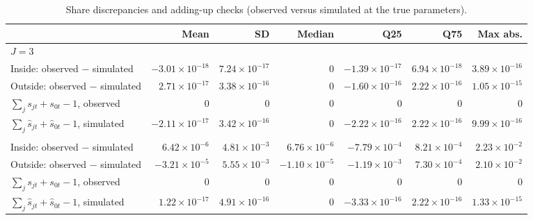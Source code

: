 \begin{table}[H]
\centering\small
\caption{Share discrepancies and adding-up checks (observed versus simulated at the true parameters).}\label{tab:q6c_shares}
\begin{adjustbox}{max width=\linewidth}
\begin{tabular}{lrrrrrr}
\toprule
 & Mean & SD & Median & Q25 & Q75 & Max abs. \\
\midrule
\multicolumn{7}{l}{\emph{$J=3$}} \\
\quad Inside: observed $-$ simulated & $-3.01\times 10^{-18}$ & $7.24\times 10^{-17}$ & 0 & $-1.39\times 10^{-17}$ & $6.94\times 10^{-18}$ & $3.89\times 10^{-16}$ \\
\quad Outside: observed $-$ simulated & $2.71\times 10^{-17}$ & $3.38\times 10^{-16}$ & 0 & $-1.60\times 10^{-16}$ & $2.22\times 10^{-16}$ & $1.05\times 10^{-15}$ \\
\quad $\sum_j s_{jt}+s_{0t}-1$, observed & 0 & 0 & 0 & 0 & 0 & 0 \\
\quad $\sum_j \hat s_{jt}+\hat s_{0t}-1$, simulated & $-2.11\times 10^{-17}$ & $3.42\times 10^{-16}$ & 0 & $-2.22\times 10^{-16}$ & $2.22\times 10^{-16}$ & $9.99\times 10^{-16}$ \\
\addlinespace
\multicolumn{7}{l}{\emph{$J=5$}} \\
\quad Inside: observed $-$ simulated & $6.42\times 10^{-6}$ & $4.81\times 10^{-3}$ & $6.76\times 10^{-6}$ & $-7.79\times 10^{-4}$ & $8.21\times 10^{-4}$ & $2.23\times 10^{-2}$ \\
\quad Outside: observed $-$ simulated & $-3.21\times 10^{-5}$ & $5.55\times 10^{-3}$ & $-1.10\times 10^{-5}$ & $-1.19\times 10^{-3}$ & $7.30\times 10^{-4}$ & $2.10\times 10^{-2}$ \\
\quad $\sum_j s_{jt}+s_{0t}-1$, observed & 0 & 0 & 0 & 0 & 0 & 0 \\
\quad $\sum_j \hat s_{jt}+\hat s_{0t}-1$, simulated & $1.22\times 10^{-17}$ & $4.91\times 10^{-16}$ & 0 & $-3.33\times 10^{-16}$ & $2.22\times 10^{-16}$ & $1.33\times 10^{-15}$ \\
\bottomrule
\end{tabular}
\end{adjustbox}
\par{}
\end{table}
